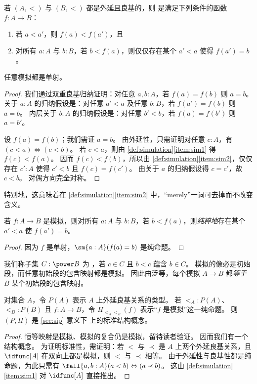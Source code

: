 \begin{defn}\label{def:simulation}
  若 $(A,<)$ 与 $(B,<)$ 都是外延且良基的，则
  是满足下列条件的函数 $f:A\to B$：
  \begin{enumerate}
  \item 若 $a<a'$，则 $f(a)<f(a')$，且\label{item:sim1}
  \item 对所有 $a:A$ 与 $b:B$，若 $b<f(a)$，则仅仅存在某个 $a'<a$ 使得 $f(a')=b$。\label{item:sim2}
  \end{enumerate}
\end{defn}

\begin{lem}
  任意模拟都是单射。
\end{lem}
\begin{proof}
  我们通过双重良基归纳证明：对任意 $a,b:A$，若 $f(a)=f(b)$ 则 $a=b$。
  关于 $a:A$ 的归纳假设是：对任意 $a'<a$ 及任意 $b:B$，若 $f(a')=f(b)$ 则 $a=b$。
  内层关于 $b:A$ 的归纳假设是：对任意 $b'<b$，若 $f(a)=f(b')$ 则 $a=b'$。

  设 $f(a)=f(b)$；我们需证 $a=b$。
  由外延性，只需证明对任意 $c:A$，有 $(c<a)\Leftrightarrow (c<b)$。
  若 $c<a$，则由 \cref{def:simulation}\ref{item:sim1} 得 $f(c)<f(a)$。
  因而 $f(c)<f(b)$，所以由 \cref{def:simulation}\ref{item:sim2}，仅仅存在 $c':A$ 使得 $c'<b$ 且 $f(c)=f(c')$。
  由关于 $a$ 的归纳假设得 $c=c'$，故 $c<b$。
  对偶方向完全对称。
\end{proof}

特别地，这意味着在 \cref{def:simulation}\ref{item:sim2} 中，“merely”一词可去掉而不改变含义。

\begin{cor}
  若 $f:A\to B$ 是模拟，则对所有 $a:A$ 与 $b:B$，若 $b<f(a)$，则\emph{纯粹地}存在某个 $a'<a$ 使 $f(a')=b$。
\end{cor}
\begin{proof}
  因为 $f$ 是单射，$\sm{a:A} (f(a)=b)$ 是纯命题。
\end{proof}

我们称子集 $C :\power B$ 为
%
%
，若 $c\in C$ 且 $b<c$ 蕴含 $b\in C$。
模拟的像必是初始段，而任意初始段的包含映射都是模拟。
因此由泛等，每个模拟 $A\to B$ 都\emph{等于} $B$ 某个初始段的包含映射。

\begin{thm}
  对集合 $A$，令 $P(A)$ 表示 $A$ 上外延良基关系的类型。
  若 $\mathord{<_A} : P(A)$、$\mathord{<_B} : P(B)$ 且 $f:A\to B$，令 $H_{\mathord{<_A}\mathord{<_B}}(f)$ 表示“$f$ 是模拟”这一纯命题。
  则 $(P,H)$ 是 \cref{sec:sip} 意义下 \uset 上的标准结构概念。
\end{thm}
\begin{proof}
  恒等映射是模拟、模拟的复合仍是模拟，留待读者验证。
  因而我们有一个结构概念。
  为证明标准性，需证明：若 $<$ 与 $\prec$ 是 $A$ 上两个外延良基关系，且 $\idfunc[A]$ 在双向上都是模拟，则 $<$ 与 $\prec$ 相等。
  由于外延性与良基性都是纯命题，为此只需有 $\fall{a,b:A} (a<b) \Leftrightarrow (a\prec b)$。
  这由 \cref{def:simulation}\ref{item:sim1} 对 $\idfunc[A]$ 直接推出。
\end{proof}

